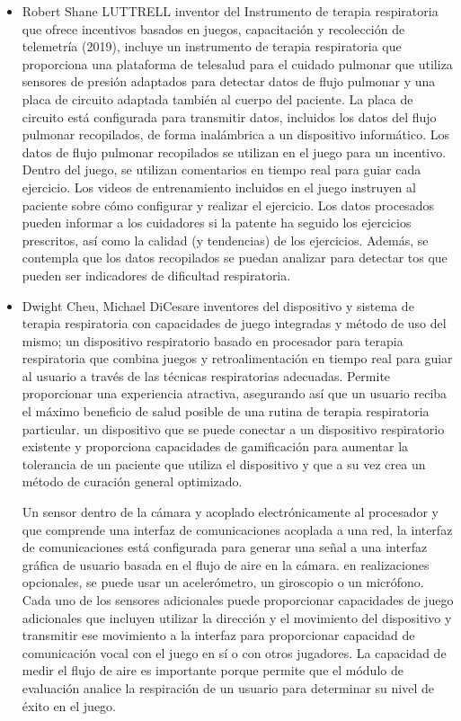 \begin{itemize}
    \item Robert Shane LUTTRELL inventor del Instrumento de terapia respiratoria que ofrece incentivos basados en juegos, capacitaci\'on y recolecci\'on de telemetr\'ia (2019),  incluye un instrumento de terapia respiratoria que proporciona una plataforma de telesalud para el cuidado pulmonar que utiliza sensores de presi\'on adaptados para detectar datos de flujo pulmonar y una placa de circuito adaptada tambi\'en al cuerpo del paciente. La placa de circuito est\'a configurada para transmitir datos, incluidos los datos del flujo pulmonar recopilados, de forma inal\'ambrica a un dispositivo inform\'atico. Los datos de flujo pulmonar recopilados se utilizan en el juego para un incentivo. Dentro del juego, se utilizan comentarios en tiempo real para guiar cada ejercicio. Los videos de entrenamiento incluidos en el juego instruyen al paciente sobre c\'omo configurar y realizar el ejercicio.  Los datos procesados pueden informar a los cuidadores si la patente ha seguido los ejercicios prescritos, as\'i como la calidad (y tendencias) de los ejercicios. Adem\'as, se contempla que los datos recopilados se puedan analizar para detectar tos que pueden ser indicadores de dificultad respiratoria.\cite{26}
    
    \item Dwight Cheu, Michael DiCesare inventores del dispositivo y sistema de terapia respiratoria con capacidades de juego integradas y m\'etodo de uso del mismo; un dispositivo respiratorio basado en procesador para terapia respiratoria que combina juegos y retroalimentaci\'on en tiempo real para guiar al usuario a trav\'es de las t\'ecnicas respiratorias adecuadas. Permite proporcionar una experiencia atractiva, asegurando as\'i que un usuario reciba el m\'aximo beneficio de salud posible de una rutina de terapia respiratoria particular. un dispositivo que se puede conectar a un dispositivo respiratorio existente y proporciona capacidades de gamificaci\'on  para aumentar la tolerancia de un paciente que utiliza el dispositivo y que a su vez crea un m\'etodo de curaci\'on general optimizado. \cite{27}
    
    Un sensor dentro de la c\'amara y acoplado electr\'onicamente al procesador y que comprende una interfaz de comunicaciones acoplada a una red, la interfaz de comunicaciones est\'a configurada para generar una se\~{n}al a una interfaz gr\'afica de usuario basada en el flujo de aire en la c\'amara. en realizaciones opcionales, se puede usar un aceler\'ometro, un giroscopio  o un micr\'ofono. Cada uno de los sensores adicionales puede proporcionar capacidades de juego adicionales que incluyen utilizar la direcci\'on y el movimiento del dispositivo y transmitir ese movimiento a la interfaz para proporcionar capacidad de comunicaci\'on vocal con el juego en s\'i o con otros jugadores.  La capacidad de medir el flujo de aire es importante porque permite que el m\'odulo de evaluaci\'on analice la respiraci\'on de un usuario para determinar su nivel de \'exito en el juego. \cite{27}



\end{itemize}
